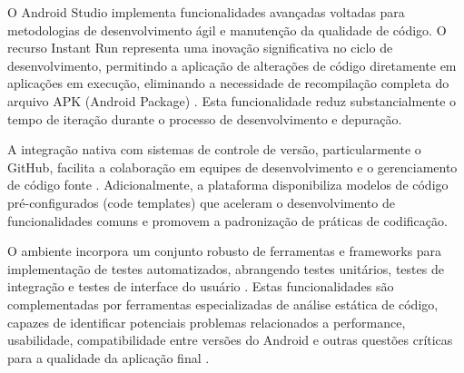 O Android Studio implementa funcionalidades avançadas voltadas para metodologias de desenvolvimento ágil e manutenção da qualidade de código. O recurso Instant Run representa uma inovação significativa no ciclo de desenvolvimento, permitindo a aplicação de alterações de código diretamente em aplicações em execução, eliminando a necessidade de recompilação completa do arquivo APK (Android Package) \cite{google2022instantrun}. Esta funcionalidade reduz substancialmente o tempo de iteração durante o processo de desenvolvimento e depuração.

A integração nativa com sistemas de controle de versão, particularmente o GitHub, facilita a colaboração em equipes de desenvolvimento e o gerenciamento de código fonte \cite{github2023integration}. Adicionalmente, a plataforma disponibiliza modelos de código pré-configurados (code templates) que aceleram o desenvolvimento de funcionalidades comuns e promovem a padronização de práticas de codificação.

O ambiente incorpora um conjunto robusto de ferramentas e frameworks para implementação de testes automatizados, abrangendo testes unitários, testes de integração e testes de interface do usuário \cite{junit2023android}. Estas funcionalidades são complementadas por ferramentas especializadas de análise estática de código, capazes de identificar potenciais problemas relacionados a performance, usabilidade, compatibilidade entre versões do Android e outras questões críticas para a qualidade da aplicação final \cite{android2023lint}.

